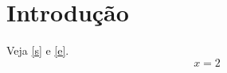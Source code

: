 \documentclass[brazil]{article}
\begin{document}
\section{Introdução}\label{s}
Veja \autoref{s} e \autoref{e}.
\begin{equation}x = 2\label{e}\end{equation}
\end{document}
